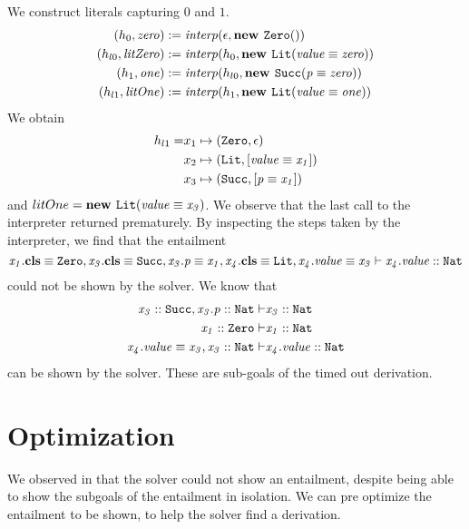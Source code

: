 We construct literals capturing $0$ and $1$.
\begin{align*}
  (h_0, \mathit{zero}) &:= \mathit{interp}(\epsilon, \textbf{new } \mathit{\texttt{Zero}}())\\
  (h_{l0}, \mathit{litZero}) &:= \mathit{interp}(h_0, \textbf{new } \mathit{\texttt{Lit}}(\mathit{\mathit{value}} \equiv \mathit{\mathit{zero}}))\\
  (h_1, \mathit{one}) &:= \mathit{interp}(h_{l0}, \textbf{new } \mathit{\texttt{Succ}}(\mathit{p} \equiv \mathit{\mathit{zero}}))\\
  (h_{l1}, \mathit{litOne}) &:= \mathit{interp}(h_1, \textbf{new } \mathit{\texttt{Lit}}(\mathit{\mathit{value}} \equiv \mathit{\mathit{one}}))
\end{align*}
We obtain
\begin{align*}
h_{l1} = &x_1 \mapsto (\texttt{Zero}, \epsilon)\\
         &x_2 \mapsto (\texttt{Lit}, [\mathit{\mathit{value}} \equiv \mathit{x_1}])\\
         &x_3 \mapsto (\texttt{Succ}, [\mathit{\mathit{p}} \equiv \mathit{x_1}])
\end{align*}
and $litOne = \textbf{new } \mathit{\texttt{Lit}}(\mathit{\mathit{value}} \equiv \mathit{\mathit{x_3}})$.
We observe that the last call to the interpreter
returned prematurely.
By inspecting the steps taken by the interpreter, we find that
the entailment
\[
  \entails{
            \instBy{x_1}{\texttt{Zero}},
            \instBy{x_3}{\texttt{Succ}},
            \pathEq{x_3.p}{x_1},
            \instBy{x_4}{\texttt{Lit}},
            \pathEq{x_4.value}{x_3}
          }
          {\instOf{x_4.value}{\texttt{Nat}}}
\]
could not be shown by the solver.
We know that
\begin{align*}
\entails
  {
    \instOf{x_3}{\texttt{Succ}},
    \instOf{x_3.p}{\texttt{Nat}}
  }
  {&\instOf{x_3}{\texttt{Nat}}}\\
\entails
  {\instOf{x_1}{\texttt{Zero}}}
  {&\instOf{x_1}{\texttt{Nat}}}\\
\entails
  {\pathEq{x_4.value}{x_3},
   \instOf{x_3}{\texttt{Nat}}}
  {&\instOf{x_4.value}{\texttt{Nat}}}
\end{align*}
can be shown by the solver.
These are sub-goals of the timed out derivation.

\section{Optimization}
We observed in 
that the solver could not show an entailment,
despite being able to show the subgoals of the entailment
in isolation.
We can pre optimize the entailment to be shown,
to help the solver find a derivation.

